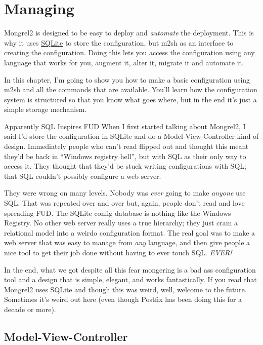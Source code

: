 \chapter{Managing}

Mongrel2 is designed to be easy to deploy and \emph{automate} the deployment.
This is why it uses \href{http://www.sqlite.org/}{SQLite} to store the configuration,
but m2sh as an interface to creating the configuration.  Doing this lets
you access the configuration using any language that works for you, augment it,
alter it, migrate it and automate it.

In this chapter, I'm going to show you how to make a basic configuration using
m2sh and all the commands that are available.  You'll learn how the configuration
system is structured so that you know what goes where, but in the end it's just
a simple storage mechanism.

\begin{aside}{Apparently SQL Inspires FUD}
When I first started talking about Mongrel2, I said I'd store the configuration
in SQLite and do a Model-View-Controller kind of design.  Immediately people who
can't read flipped out and thought this meant they'd be back in ``Windows registry hell'',
but with SQL as their only way to access it.  They thought that they'd be stuck writing
configurations with SQL; that SQL couldn't possibly configure a web server.

They were wrong on many levels.  Nobody was \emph{ever} going to make \emph{anyone} use
SQL.  That was repeated over and over but, again, people don't read and love spreading
FUD.  The SQLite config database is nothing like the Windows Registry.  No other web
server really uses a true hierarchy; they just cram a relational model into a weirdo
configuration format.  The real goal was to make a web server that was easy to manage from
\emph{any} language, and then give people a nice tool to get their job done without
having to ever touch SQL.  \emph{EVER!}

In the end, what we got despite all this fear mongering is a bad ass configuration
tool and a design that is simple, elegant, and works fantastically.  If you read that
Mongrel2 uses SQLite and though this was weird, well, welcome to the future.  Sometimes
it's weird out here (even though Postfix has been doing this for a decade or more).
\end{aside}


\section{Model-View-Controller}

